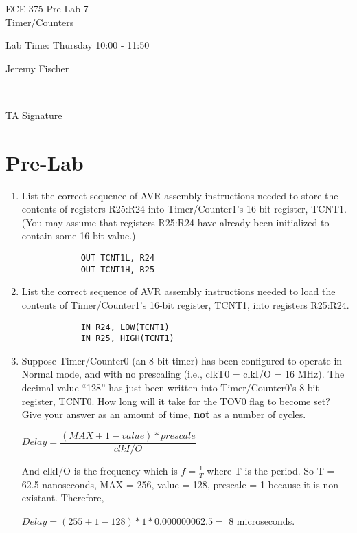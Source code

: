 \documentclass[12pt,letterpaper]{article}
\begin{document}
\begin{titlepage}
    \vspace*{4cm}
    \begin{flushright}
    {\huge
        ECE 375 Pre-Lab 7\\[1cm]
    }
    {\large
     	 Timer/Counters
    }
    \end{flushright}
    \begin{flushleft}
    Lab Time: Thursday 10:00 - 11:50
    \end{flushleft}
    \begin{flushright}
    Jeremy Fischer
    
    \vfill
    \rule{5in}{.5mm}\\
    TA Signature
    \end{flushright}

\end{titlepage}


\section{Pre-Lab}

	\begin{enumerate}
		\item
		 List the correct sequence of AVR assembly instructions needed to store the contents of registers R25:R24 into Timer/Counter1’s 16-bit register, TCNT1. 
		 (You may assume that registers R25:R24 have already been initialized to contain some 16-bit value.)
		
		\begin{verbatim}
			OUT TCNT1L, R24
			OUT TCNT1H, R25
		\end{verbatim}
		
		
		
		
		
		\item
		 List the correct sequence of AVR assembly instructions needed to load the contents of Timer/Counter1’s 16-bit register, TCNT1, into registers R25:R24.
		
		
		\begin{verbatim}
			IN R24, LOW(TCNT1)	
			IN R25, HIGH(TCNT1)
		\end{verbatim}
		
		
		
		
		\item
		Suppose Timer/Counter0 (an 8-bit timer) has been configured to operate in Normal mode, and with no prescaling (i.e., clkT0 = clkI/O = 16 MHz). 
		The decimal value “128” has just been written into Timer/Counter0’s 8-bit register, TCNT0. 
		How long will it take for the TOV0 flag to become set? Give your answer as an amount of time, \textbf{not} as a number of cycles.
		
		
		$Delay = \dfrac{(MAX + 1 - value) * prescale} {clkI/O}$
		
		And clkI/O is the frequency which is $f = \frac{1}{T}$ where T is the period.
		So T = 62.5 nanoseconds, MAX = 256, value = 128, prescale = 1 because it is non-existant.
		Therefore,
		
		$Delay = (255 + 1 - 128) * 1 * 0.000000062.5 = $  8 microseconds.
	\end{enumerate}
\end{document}

